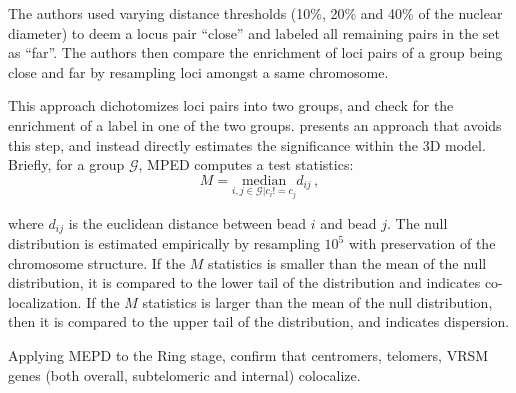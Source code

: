 \documentclass[letterpaper,12pt]{article}
\begin{document}
The authors used varying distance
thresholds (10\%, 20\% and 40\% of the nuclear diameter) to deem a locus pair
“close” and labeled all remaining
pairs in the set as “far”.  The authors then compare the enrichment of loci
pairs of a group being close and far by resampling loci amongst a same
chromosome.

This approach dichotomizes loci pairs into two groups, and check for the
enrichment of a label in one of the two groups. \citep{capurso:distance-based}
presents an approach that avoids this step, and instead directly estimates the
significance within the 3D model. Briefly, for a group $\mathcal{G}$, MPED
computes a test statistics:
\begin{equation*}
M = \underset{i,j \in \mathcal{G}| c_i != c_j}{\text{median}} d_{ij}\,,
\end{equation*}

where $d_{ij}$ is the euclidean distance between bead $i$ and bead $j$. The
null distribution is estimated empirically by resampling $10^5$ with
preservation of the chromosome structure. If the $M$ statistics is smaller
than the mean of the null distribution, it is compared to the lower tail of
the distribution and indicates co-localization. If the $M$ statistics is
larger than the mean of the null distribution, then it is compared to the
upper tail of the distribution, and indicates dispersion.

Applying MEPD to the Ring stage, \citet{capurso:distance-based} confirm that
centromers, telomers, VRSM genes (both overall, subtelomeric and internal)
colocalize.
\end{document}
